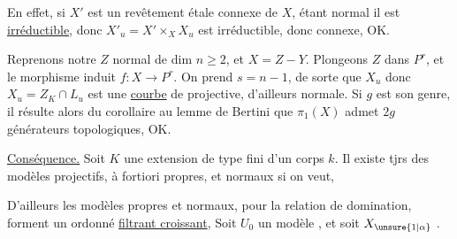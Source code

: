 En effet, si $X'$ est un revêtement 
étale connexe de $X$, étant normal il est \uline{irréductible},
donc $X'_u=X'\times_X X_u$ est irréductible,
donc connexe, OK.


Reprenons notre $Z$ normal de dim $n\geq2$, et $X=Z-Y$.
Plongeons $Z$ dans $P^r$, et le morphisme induit $f:X\to P^r$.
On prend $s=n-1$, de sorte que
$X_u$ 
donc $X_u=Z_K\cap L_u$ est une \uline{courbe} de
 projective, d'ailleurs normale.
Si $g$ est son genre, il résulte alors du corollaire au lemme de Bertini
que $\pi_1(X)$ admet $2g$ générateurs topologiques, OK.

\uline{Conséquence.} Soit $K$ une extension de type fini d'un corps $k$.
Il existe tjrs des modèles projectifs,
à fortiori propres, et normaux si on veut,


D'ailleurs les modèles propres et normaux, pour la relation de domination,
forment un ordonné \uline{filtrant croissant},
Soit $U_0$ un  modèle
,
et soit $X_{\unsure{1|\alpha}}$
.


